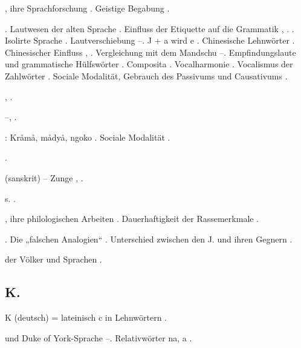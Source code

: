 \begin{register}
, ihre Sprachforschung \pageref{sp.24}. Geistige Begabung \pageref{sp.389}.

. Lautwesen der alten Sprache \pageref{sp.34}. Einfluss der Etiquette auf die Grammatik \pageref{sp.95}, \pageref{sp.246}.  \pageref{sp.129}. Isolirte Sprache \pageref{sp.147}. Lautverschiebung \pageref{sp.190}–\pageref{sp.191}. J + a wird e \pageref{sp.199}.  Chinesische Lehnwörter \pageref{sp.266}. Chinesischer Einfluss \pageref{sp.271}, \pageref{sp.428}. Vergleichung mit dem Mandschu \pageref{sp.289}–\pageref{sp.290}. Empfindungslaute und grammatische Hülfswörter \pageref{sp.347}. Composita   \pageref{sp.379}. Vocalharmonie \pageref{sp.402}. Vocalismus der Zahlwörter \pageref{sp.408}. Sociale Modalität, Gebrauch des Passivums und Causativums \pageref{sp.474}.

 \pageref{sp.162}, \pageref{sp.282}.

 \pageref{sp.126}–\pageref{sp.126}, \pageref{sp.289}.

: Kråmå, mådyå, ngoko \pageref{sp.246}. Sociale Modalität \pageref{sp.475}.

 \pageref{sp.322}.

 (sanskrit) – Zunge \pageref{sp.185}, \pageref{sp.217}.

 s. .

, ihre philologischen Arbeiten \pageref{sp.22}. Dauerhaftigkeit der Rassemerkmale \pageref{sp.147}. 

. Die „falschen Analogien“ \pageref{sp.137}. Unterschied zwischen den J. und ihren Gegnern \pageref{sp.181}.

 der Völker und Sprachen \pageref{sp.399}.

\subsection*{K. }\label{reg.K}

K (deutsch) = lateinisch c in Lehnwörtern \pageref{sp.186}.

 und Duke of York-Sprache \pageref{sp.165}–\pageref{sp.166}.  Relativwörter na, a \pageref{sp.457}.


\end{register}
